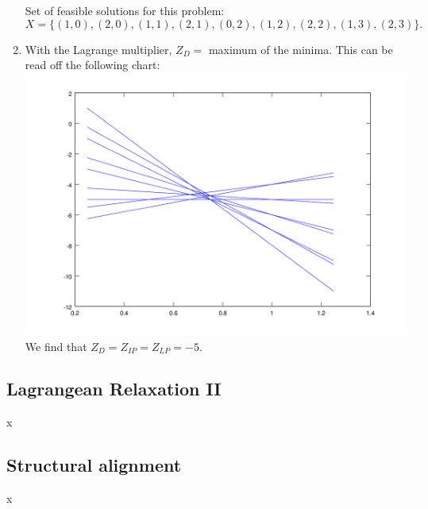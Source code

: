 \documentclass[a4paper, oneside]{scrartcl}
\begin{document}
\begin{enumerate}
Set of feasible solutions for this problem: 
\[
X = \{(1, 0), (2, 0), (1, 1), (2,
1), (0, 2), (1, 2), (2, 2), (1, 3), (2, 3)\}.
\]
\item With the Lagrange multiplier, $Z_D =$ maximum of the minima. This can be
read off the following chart:\\
\includegraphics[width=\textwidth]{ex11_1_c_good.png}\\
We find that $Z_D = Z_{IP} = Z_{LP} = -5$.
\end{enumerate}

\subsection{Lagrangean Relaxation II}

x

\subsection{Structural alignment}

x
\end{document}
